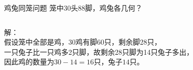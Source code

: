 \documentclass[aspectratio=169]{ctexbeamer} %
\date{\today}
\begin{document}
\begin{frame}[t]{鸡兔同笼问题}
笼中30头88脚，鸡兔各几何？\\
\pause
\begin{columns}
解：\\
假设笼中全部是鸡，30鸡有脚60只，剩余脚28只，\\
一只兔子比一只鸡多2只脚，故剩余28只脚为14只兔子多出，\\
因此鸡的数量为\alert{$30 - 14 = 16$}只，兔子\alert{$14$}只。
\end{columns}
\end{frame}
\end{document}
